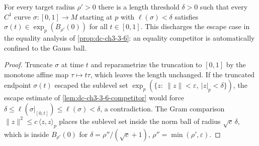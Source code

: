 \begin{lemma}
  \label{lem:dc-ch3-3-6-confinement}


  For every target radius $\rho'>0$ there is a length threshold $\delta>0$
  such that every $C^1$ curve $\sigma:[0,1]\to M$ starting at $p$ with
  $\ell(\sigma)<\delta$ satisfies $\sigma(t)\in\exp_p(B_{\rho'}(0))$ for all
  $t\in[0,1]$. This discharges the escape case in the equality analysis of
  \cref{prop:dc-ch3-3-6}: an equality competitor is automatically confined
  to the Gauss ball.
\end{lemma}
\begin{proof}
  \sketch

  Truncate $\sigma$ at time $t$ and reparametrize the truncation to $[0,1]$
  by the monotone affine map $\tau\mapsto t\tau$, which leaves the length
  unchanged. If the truncated endpoint $\sigma(t)$ escaped the sublevel set
  $\exp_p(\{z:\ \|z\|<\varepsilon,\ |z|_p<\delta\})$, the escape estimate of
  \cref{lem:dc-ch3-3-6-competitor} would force
  $\delta\le\ell(\sigma|_{[0,t]})\le\ell(\sigma)<\delta$, a contradiction.
  The Gram comparison $\|z\|^2\le c\,\langle z,z\rangle_p$ places the
  sublevel set inside the norm ball of radius $\sqrt{c}\,\delta$, which is
  inside $B_{\rho'}(0)$ for $\delta=\rho''/(\sqrt{c}+1)$,
  $\rho''=\min(\rho',\varepsilon)$.
\end{proof}

